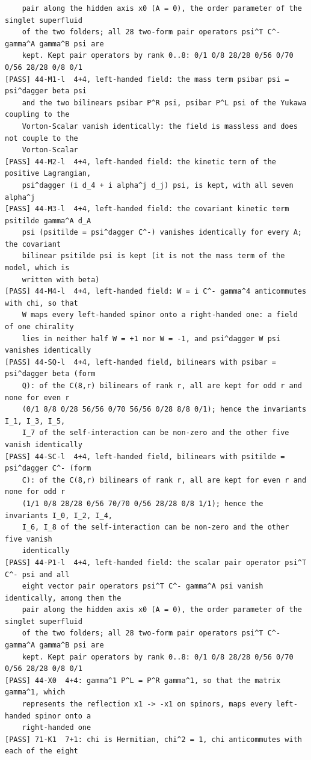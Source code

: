 \documentclass[
  10pt,
]{article}
\begin{document}
\begin{verbatim}
    pair along the hidden axis x0 (A = 0), the order parameter of the singlet superfluid
    of the two folders; all 28 two-form pair operators psi^T C^- gamma^A gamma^B psi are
    kept. Kept pair operators by rank 0..8: 0/1 0/8 28/28 0/56 0/70 0/56 28/28 0/8 0/1
[PASS] 44-M1-l  4+4, left-handed field: the mass term psibar psi = psi^dagger beta psi
    and the two bilinears psibar P^R psi, psibar P^L psi of the Yukawa coupling to the
    Vorton-Scalar vanish identically: the field is massless and does not couple to the
    Vorton-Scalar
[PASS] 44-M2-l  4+4, left-handed field: the kinetic term of the positive Lagrangian,
    psi^dagger (i d_4 + i alpha^j d_j) psi, is kept, with all seven alpha^j
[PASS] 44-M3-l  4+4, left-handed field: the covariant kinetic term psitilde gamma^A d_A
    psi (psitilde = psi^dagger C^-) vanishes identically for every A; the covariant
    bilinear psitilde psi is kept (it is not the mass term of the model, which is
    written with beta)
[PASS] 44-M4-l  4+4, left-handed field: W = i C^- gamma^4 anticommutes with chi, so that
    W maps every left-handed spinor onto a right-handed one: a field of one chirality
    lies in neither half W = +1 nor W = -1, and psi^dagger W psi vanishes identically
[PASS] 44-SQ-l  4+4, left-handed field, bilinears with psibar = psi^dagger beta (form
    Q): of the C(8,r) bilinears of rank r, all are kept for odd r and none for even r
    (0/1 8/8 0/28 56/56 0/70 56/56 0/28 8/8 0/1); hence the invariants I_1, I_3, I_5,
    I_7 of the self-interaction can be non-zero and the other five vanish identically
[PASS] 44-SC-l  4+4, left-handed field, bilinears with psitilde = psi^dagger C^- (form
    C): of the C(8,r) bilinears of rank r, all are kept for even r and none for odd r
    (1/1 0/8 28/28 0/56 70/70 0/56 28/28 0/8 1/1); hence the invariants I_0, I_2, I_4,
    I_6, I_8 of the self-interaction can be non-zero and the other five vanish
    identically
[PASS] 44-P1-l  4+4, left-handed field: the scalar pair operator psi^T C^- psi and all
    eight vector pair operators psi^T C^- gamma^A psi vanish identically, among them the
    pair along the hidden axis x0 (A = 0), the order parameter of the singlet superfluid
    of the two folders; all 28 two-form pair operators psi^T C^- gamma^A gamma^B psi are
    kept. Kept pair operators by rank 0..8: 0/1 0/8 28/28 0/56 0/70 0/56 28/28 0/8 0/1
[PASS] 44-X0  4+4: gamma^1 P^L = P^R gamma^1, so that the matrix gamma^1, which
    represents the reflection x1 -> -x1 on spinors, maps every left-handed spinor onto a
    right-handed one
[PASS] 71-K1  7+1: chi is Hermitian, chi^2 = 1, chi anticommutes with each of the eight

\end{verbatim}
\end{document}
